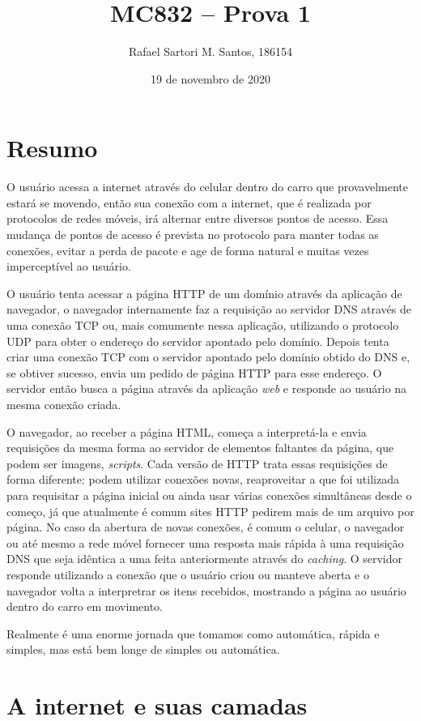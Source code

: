 \documentclass[brazilian,a4paper,twocolumn]{article}
\title{MC832 -- Prova 1}
\author{Rafael Sartori M. Santos, 186154}
\date{19 de novembro de 2020}
\begin{document}
\maketitle

\section{Resumo}

O usuário acessa a internet através do celular dentro do carro que provavelmente estará se movendo, então sua conexão com a internet, que é realizada por protocolos de redes móveis, irá alternar entre diversos pontos de acesso. Essa mudança de pontos de acesso é prevista no protocolo para manter todas as conexões, evitar a perda de pacote e age de forma natural e muitas vezes imperceptível ao usuário.

O usuário tenta acessar a página HTTP de um domínio através da aplicação de navegador, o navegador internamente faz a requisição ao servidor DNS através de uma conexão TCP ou, mais comumente nessa aplicação, utilizando o protocolo UDP para obter o endereço do servidor apontado pelo domínio. Depois tenta criar uma conexão TCP com o servidor apontado pelo domínio obtido do DNS e, se obtiver sucesso, envia um pedido de página HTTP para esse endereço. O servidor então busca a página através da aplicação \textit{web} e responde ao usuário na mesma conexão criada.

O navegador, ao receber a página HTML, começa a interpretá-la e envia requisições da mesma forma ao servidor de elementos faltantes da página, que podem ser imagens, \textit{scripts}. Cada versão de HTTP trata essas requisições de forma diferente: podem utilizar conexões novas, reaproveitar a que foi utilizada para requisitar a página inicial ou ainda usar várias conexões simultâneas desde o começo, já que atualmente é comum sites HTTP pedirem mais de um arquivo por página. No caso da abertura de novas conexões, é comum o celular, o navegador ou até mesmo a rede móvel fornecer uma resposta mais rápida à uma requisição DNS que seja idêntica a uma feita anteriormente através do \textit{caching}. O servidor responde utilizando a conexão que o usuário criou ou manteve aberta e o navegador volta a interpretrar os itens recebidos, mostrando a página ao usuário dentro do carro em movimento.

Realmente é uma enorme jornada que tomamos como automática, rápida e simples, mas está bem longe de simples ou automática.


\section{A internet e suas camadas}
\end{document}
